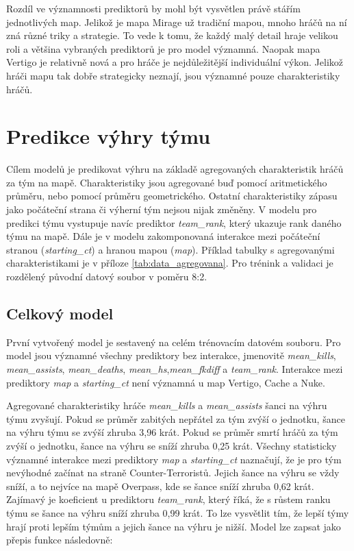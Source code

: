 Rozdíl
{\color{red}
ve významnosti prediktorů
}
by mohl být vysvětlen právě stářím jednotlivých map. Jelikož je mapa Mirage už tradiční mapou, mnoho hráčů na ní zná různé triky a strategie. To vede k tomu, že
každý malý detail hraje velikou roli a většina vybraných prediktorů je pro model významná. Naopak mapa Vertigo je relativně nová a pro hráče je nejdůležitější individuální
výkon. Jelikož hráči mapu tak dobře strategicky neznají, jsou významné pouze charakteristiky hráčů.

\newpage
\section{Predikce výhry týmu}
Cílem modelů je predikovat výhru na základě agregovaných charakteristik hráčů za tým na mapě. Charakteristiky jsou agregované buď pomocí aritmetického průměru,
nebo pomocí průměru geometrického. Ostatní charakteristiky zápasu jako počáteční strana či výherní tým nejsou nijak změněny. V modelu pro predikci týmu vystupuje
navíc prediktor \textit{team\_rank}, který ukazuje rank daného týmu na mapě. Dále je v modelu zakomponovaná interakce
mezi počáteční stranou (\textit{starting\_ct}) a hranou mapou (\textit{map}). Příklad tabulky s agregovanými charakteristikami je v příloze \ref{tab:data_agregovana}.
Pro trénink a validaci je rozdělený původní datový soubor v poměru 8:2.

\subsection{Celkový model}



První vytvořený model je sestavený na celém trénovacím datovém souboru. Pro model jsou významné všechny prediktory bez interakce, jmenovitě \textit{mean\_kills},
\textit{mean\_assists}, \textit{mean\_deaths}, \textit{mean\_hs},\textit{mean\_fkdiff} a \textit{team\_rank}. Interakce mezi prediktory \textit{map} a
\textit{starting\_ct} není významná u map Vertigo, Cache a Nuke.

Agregované charakteristiky hráče \textit{mean\_kills} a \textit{mean\_assists} šanci na výhru týmu zvyšují. Pokud se průměr zabitých nepřátel za tým zvýší o jednotku,
šance na výhru týmu se zvýší zhruba 3,96 krát. Pokud se průměr smrtí hráčů za tým zvýší o jednotku, šance na výhru se sníží zhruba 0,25 krát. Všechny statisticky
významné interakce mezi prediktory \textit{map} a \textit{starting\_ct} naznačují, že je pro tým nevýhodné začínat na straně Counter-Terroristů. Jejich šance
na výhru se vždy sníží, a to nejvíce na mapě Overpass, kde se šance sníží zhruba 0,62 krát. Zajímavý je koeficient u prediktoru \textit{team\_rank}, který říká,
že s růstem ranku týmu se šance na výhru sníží zhruba 0,99 krát. To lze vysvětlit tím, že lepší týmy hrají proti lepším týmům a jejich 
šance na výhru je nižší. Model lze zapsat jako přepis funkce následovně:

